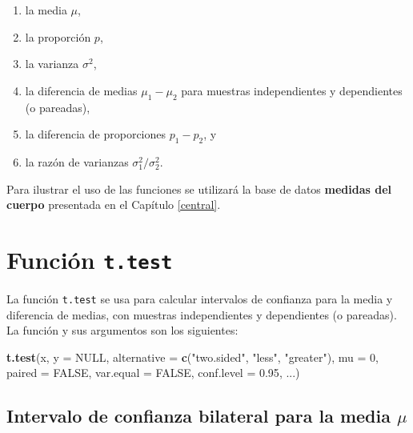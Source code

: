\documentclass[10pt,]{krantz}
\makeatletter
\newenvironment{Shaded}{\begin{snugshade}}{\end{snugshade}}
\newcommand{\KeywordTok}[1]{\textcolor[rgb]{0.13,0.29,0.53}{\textbf{{#1}}}}
\newcommand{\DataTypeTok}[1]{\textcolor[rgb]{0.13,0.29,0.53}{{#1}}}
\newcommand{\DecValTok}[1]{\textcolor[rgb]{0.00,0.00,0.81}{{#1}}}
\newcommand{\FloatTok}[1]{\textcolor[rgb]{0.00,0.00,0.81}{{#1}}}
\newcommand{\StringTok}[1]{\textcolor[rgb]{0.31,0.60,0.02}{{#1}}}
\newcommand{\OtherTok}[1]{\textcolor[rgb]{0.56,0.35,0.01}{{#1}}}
\newcommand{\NormalTok}[1]{{#1}}
\providecommand{\tightlist}{%
  \setlength{\itemsep}{0pt}\setlength{\parskip}{0pt}}
\newenvironment{kframe}{%
\medskip{}
\setlength{\fboxsep}{.8em}
 \def\at@end@of@kframe{}%
 \ifinner\ifhmode%
  \def\at@end@of@kframe{\end{minipage}}%
  \begin{minipage}{\columnwidth}%
 \fi\fi%
 \def\FrameCommand##1{\hskip\@totalleftmargin \hskip-\fboxsep
 \colorbox{shadecolor}{##1}\hskip-\fboxsep
     \hskip-\linewidth \hskip-\@totalleftmargin \hskip\columnwidth}%
 \MakeFramed {\advance\hsize-\width
   \@totalleftmargin\z@ \linewidth\hsize
   \@setminipage}}%
 {\par\unskip\endMakeFramed%
 \at@end@of@kframe}
\renewenvironment{Shaded}{\begin{kframe}}{\end{kframe}}
\makeatother
\begin{document}
\begin{enumerate}
\def\labelenumi{\arabic{enumi}.}
\tightlist
\item
  la media \(\mu\),
\item
  la proporción \(p\),
\item
  la varianza \(\sigma^2\),
\item
  la diferencia de medias \(\mu_1-\mu_2\) para muestras independientes y
  dependientes (o pareadas),
\item
  la diferencia de proporciones \(p_1 - p_2\), y
\item
  la razón de varianzas \(\sigma_1^2 / \sigma_2^2\).
\end{enumerate}

Para ilustrar el uso de las funciones se utilizará la base de datos
\textbf{medidas del cuerpo} presentada en el Capítulo \ref{central}.

\section{\texorpdfstring{Función
\texttt{t.test}}{Función t.test}}\label{funcion-t.test}

La función \texttt{t.test} se usa para calcular intervalos de confianza
para la media y diferencia de medias, con muestras independientes y
dependientes (o pareadas). La función y sus argumentos son los
siguientes:

\begin{Shaded}
\begin{Highlighting}[]
\KeywordTok{t.test}\NormalTok{(x, }\DataTypeTok{y =} \OtherTok{NULL}\NormalTok{,}
       \DataTypeTok{alternative =} \KeywordTok{c}\NormalTok{(}\StringTok{"two.sided"}\NormalTok{, }\StringTok{"less"}\NormalTok{, }\StringTok{"greater"}\NormalTok{),}
       \DataTypeTok{mu =} \DecValTok{0}\NormalTok{, }\DataTypeTok{paired =} \OtherTok{FALSE}\NormalTok{, }\DataTypeTok{var.equal =} \OtherTok{FALSE}\NormalTok{,}
       \DataTypeTok{conf.level =} \FloatTok{0.95}\NormalTok{, ...)}
\end{Highlighting}
\end{Shaded}

\subsection{\texorpdfstring{Intervalo de confianza bilateral para la
media
\(\mu\)}{Intervalo de confianza bilateral para la media \textbackslash{}mu}}\label{intervalo-de-confianza-bilateral-para-la-media-mu}
\end{document}
